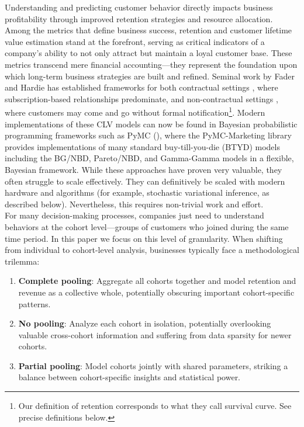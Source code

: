 \documentclass[11pt]{amsart}
\theoremstyle{definition}
\begin{document}
Understanding and predicting customer behavior directly impacts business profitability through improved retention strategies
and resource allocation. Among the metrics that define business success, retention and customer lifetime value
estimation stand at the forefront, serving as critical indicators of a company's ability to not only attract but maintain a
loyal customer base. These metrics transcend mere financial accounting—they represent the foundation upon which long-term
business strategies are built and refined. Seminal work by Fader and Hardie has established frameworks for both contractual
settings \cite{FaderHardie2007}, where subscription-based relationships predominate, and non-contractual settings
\cite{FaderHardie2005}, where customers may come and go without formal notification\footnote{Our definition of retention
    corresponds to what they call survival curve. See precise definitions below.}. Modern implementations of these CLV
models can now be found in Bayesian probabilistic programming frameworks such as PyMC (\cite{pymc2023}), where the
PyMC-Marketing library \cite{pymc_marketing} provides implementations of many standard buy-till-you-die (BTYD) models including
the BG/NBD, Pareto/NBD, and Gamma-Gamma models in a flexible, Bayesian framework. While these approaches have proven very valuable, they
often struggle to scale effectively. They can definitively be scaled with modern hardware and algorithms (for example,
stochastic variational inference, as described below). Nevertheless, this requires non-trivial work and effort.\\

For many decision-making processes, companies just need to understand behaviors at the cohort level—groups of customers
who joined during the same time period. In this paper we focus on this level of granularity. When shifting from individual
to cohort-level analysis, businesses typically face a methodological trilemma:

\begin{enumerate}
    \item \textbf{Complete pooling}: Aggregate all cohorts together and model retention and revenue as a collective whole,
          potentially obscuring important cohort-specific patterns.

    \item \textbf{No pooling}: Analyze each cohort in isolation, potentially overlooking valuable cross-cohort information
          and suffering from data sparsity for newer cohorts.

    \item \textbf{Partial pooling}: Model cohorts jointly with shared parameters, striking a balance between cohort-specific
          insights and statistical power.
\end{enumerate}
\end{document}
